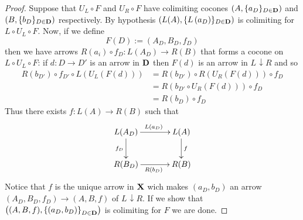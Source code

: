 \documentclass[runningheads,envcountsect]{lipics-v2021}
\def\B{\textbf {\textup{B}}}
\def\D{\textbf {\textup{D}}}
\def\X{\textbf {\textup{X}}}
\def\A{\textbf {\textup{A}}}
\newcommand{\comma}[2]{#1\hspace{1pt} {\downarrow}#2}
\begin{document}
\begin{proof}
	Suppose that $U_L\circ F$ and $U_R\circ F$ have colimiting cocones  $\left(A, \{a_D\}_{D\in \D}\right)$ and $\left(B, \{b_D\}_{D\in \D}\right)$ respectively. By hypothesis $\left(L(A), \{L\left(a_D\right)\}_{D\in \D}\right)$ is colimiting for $L\circ U_L\circ F$. Now, if we define
	\[F(D):=(A_D, B_D, f_D)\]
	then we have arrows $R(a_i)\circ f_D\colon L(A_D)\to R(B)$ that forms a cocone on $L\circ U_L\circ F$: if $d\colon D\to D'$ is an arrow in $\D$ then $F(d)$ is an arrow in $\comma{L}{R}$ and so
	\begin{align*}
		R\left(b_{D'}\right)\circ f_{D'}\circ L(U_L(F(d)))&=R\left(b_{D'}\right)\circ R\left(U_R\left(F(d)\right)\right)\circ f_D\\&=R\left(b_{D'}\circ U_R\left(F(d)\right)\right)\circ f_D\\&=R\left(b_D\right)\circ f_D
	\end{align*}
	Thus there exists $f\colon L(A)\rightarrow R(B)$ such that
	\[\xymatrix@C=35pt{ L(A_D) \ar[r]^{L(a_D)} \ar[d]_{f_D}& L(A) \ar[d]^{f}\\ R(B_D) \ar[r]_{R(b_D)} &R(B)}\]
	Notice that $f$ is the unique arrow in $\X$ wich makes $\left(a_D, b_D\right)$ an arrow $\left(A_D, B_D, f_D\right)\to \left(A, B, f\right)$ of $\comma{L}{R}$. If we show that $\left((A, B, f), \left\{(a_D, b_D)\right\}_{D\in \D}\right)$ is colimiting for $F$ we are done.
	

\end{proof}
\end{document}
